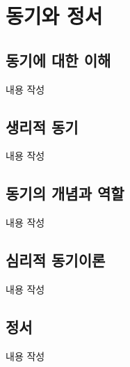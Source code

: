 \section{동기와 정서}

\subsection{동기에 대한 이해}
내용 작성

\subsection{생리적 동기}
내용 작성

\subsection{동기의 개념과 역할}
내용 작성

\subsection{심리적 동기이론}
내용 작성

\subsection{정서}
내용 작성
